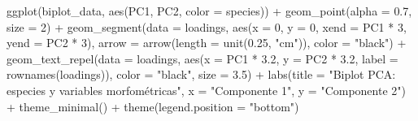 \documentclass[
  spanish,
  11pt,
  a4paper,
  DIV=11,
  numbers=noendperiod]{scrartcl}
\newenvironment{Shaded}{\begin{snugshade}}{\end{snugshade}}
\newcommand{\AttributeTok}[1]{\textcolor[rgb]{0.40,0.45,0.13}{#1}}
\newcommand{\DecValTok}[1]{\textcolor[rgb]{0.68,0.00,0.00}{#1}}
\newcommand{\FloatTok}[1]{\textcolor[rgb]{0.68,0.00,0.00}{#1}}
\newcommand{\FunctionTok}[1]{\textcolor[rgb]{0.28,0.35,0.67}{#1}}
\newcommand{\NormalTok}[1]{\textcolor[rgb]{0.00,0.23,0.31}{#1}}
\newcommand{\SpecialCharTok}[1]{\textcolor[rgb]{0.37,0.37,0.37}{#1}}
\newcommand{\StringTok}[1]{\textcolor[rgb]{0.13,0.47,0.30}{#1}}
\begin{document}
\begin{Shaded}
\begin{Highlighting}[numbers=left,,]
\FunctionTok{ggplot}\NormalTok{(biplot\_data, }\FunctionTok{aes}\NormalTok{(PC1, PC2, }\AttributeTok{color =}\NormalTok{ species)) }\SpecialCharTok{+}
  \FunctionTok{geom\_point}\NormalTok{(}\AttributeTok{alpha =} \FloatTok{0.7}\NormalTok{, }\AttributeTok{size =} \DecValTok{2}\NormalTok{) }\SpecialCharTok{+}
  \FunctionTok{geom\_segment}\NormalTok{(}\AttributeTok{data =}\NormalTok{ loadings,}
               \FunctionTok{aes}\NormalTok{(}\AttributeTok{x =} \DecValTok{0}\NormalTok{, }\AttributeTok{y =} \DecValTok{0}\NormalTok{, }\AttributeTok{xend =}\NormalTok{ PC1 }\SpecialCharTok{*} \DecValTok{3}\NormalTok{, }\AttributeTok{yend =}\NormalTok{ PC2 }\SpecialCharTok{*} \DecValTok{3}\NormalTok{),}
               \AttributeTok{arrow =} \FunctionTok{arrow}\NormalTok{(}\AttributeTok{length =} \FunctionTok{unit}\NormalTok{(}\FloatTok{0.25}\NormalTok{, }\StringTok{"cm"}\NormalTok{)), }
               \AttributeTok{color =} \StringTok{"black"}\NormalTok{) }\SpecialCharTok{+}
  \FunctionTok{geom\_text\_repel}\NormalTok{(}\AttributeTok{data =}\NormalTok{ loadings,}
                  \FunctionTok{aes}\NormalTok{(}\AttributeTok{x =}\NormalTok{ PC1 }\SpecialCharTok{*} \FloatTok{3.2}\NormalTok{, }\AttributeTok{y =}\NormalTok{ PC2 }\SpecialCharTok{*} \FloatTok{3.2}\NormalTok{, }\AttributeTok{label =} \FunctionTok{rownames}\NormalTok{(loadings)),}
                  \AttributeTok{color =} \StringTok{"black"}\NormalTok{, }\AttributeTok{size =} \FloatTok{3.5}\NormalTok{) }\SpecialCharTok{+}
  \FunctionTok{labs}\NormalTok{(}\AttributeTok{title =} \StringTok{"Biplot PCA: especies y variables morfométricas"}\NormalTok{,}
       \AttributeTok{x =} \StringTok{"Componente 1"}\NormalTok{,}
       \AttributeTok{y =} \StringTok{"Componente 2"}\NormalTok{) }\SpecialCharTok{+}
  \FunctionTok{theme\_minimal}\NormalTok{() }\SpecialCharTok{+}
  \FunctionTok{theme}\NormalTok{(}\AttributeTok{legend.position =} \StringTok{"bottom"}\NormalTok{)}
\end{Highlighting}
\end{Shaded}
\end{document}
